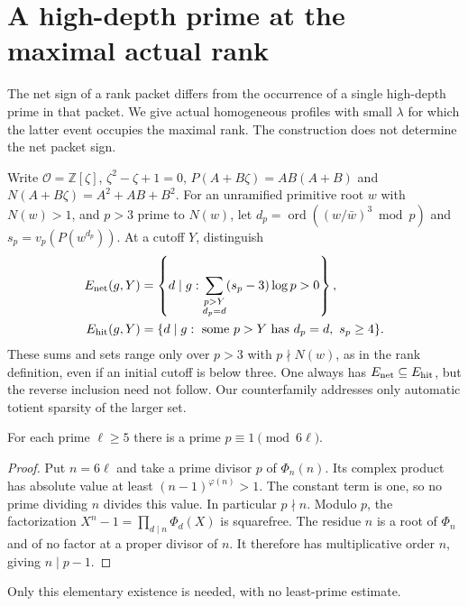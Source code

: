 \section{A high-depth prime at the maximal actual rank}
\label{hr-section}

The net sign of a rank packet differs from the occurrence of a single
high-depth prime in that packet. We give actual homogeneous profiles
with small $\lambda$ for which the latter event occupies the maximal
rank. The construction does not determine the net packet sign.

Write $\mathcal O=\mathbb Z[\zeta]$, $\zeta^2-\zeta+1=0$,
$P(A+B\zeta)=AB(A+B)$ and $N(A+B\zeta)=A^2+AB+B^2$.
For an unramified primitive root $w$ with $N(w)>1$, and $p>3$ prime
to $N(w)$, let
$d_p=\operatorname{ord}((w/\bar w)^3\bmod p)$ and
$s_p=v_p(P(w^{d_p}))$. At a cutoff $Y$, distinguish
\begin{align*}
 E_{\rm net}(g,Y)&=\left\{d\mid g:
    \sum_{\substack{p>Y\\d_p=d}}(s_p-3)\log p>0\right\},\\
 E_{\rm hit}(g,Y)&=\{d\mid g:\text{ some }p>Y
                            \text{ has }d_p=d,\ s_p\ge4\}.
\end{align*}
These sums and sets range only over $p>3$ with $p\nmid N(w)$,
as in the rank definition, even if an initial cutoff is below three.
One always has $E_{\rm net}\subseteq E_{\rm hit}$, but the reverse
inclusion need not follow. Our counterfamily addresses only automatic
totient sparsity of the larger set.

\begin{lemma}\label{hr-prime}
For each prime $\ell\ge5$ there is a prime $p\equiv1\pmod{6\ell}$.
\end{lemma}
\begin{proof}
Put $n=6\ell$ and take a prime divisor $p$ of $\Phi_n(n)$.
Its complex product has absolute value at least $(n-1)^{\varphi(n)}>1$.
The constant term is one, so no prime dividing $n$ divides this value.
In particular $p\nmid n$. Modulo $p$, the factorization
$X^n-1=\prod_{d\mid n}\Phi_d(X)$ is squarefree. The residue $n$
is a root of $\Phi_n$ and of no factor at a proper divisor of $n$.
It therefore has multiplicative order $n$, giving $n\mid p-1$.
\end{proof}
Only this elementary existence is needed, with no least-prime estimate.

